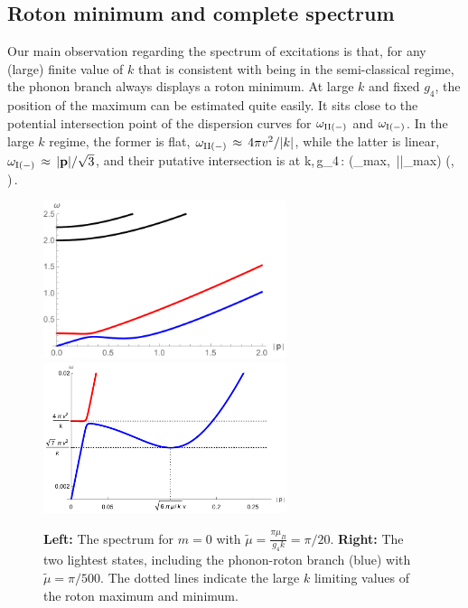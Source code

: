 \subsection{Roton minimum and complete spectrum}
Our main observation regarding the spectrum of excitations is that, for any (large) finite value of $k$ that is consistent with being in the semi-classical regime, the phonon branch always displays a roton minimum. 
At large $k$ and fixed $g_4$, the position of the maximum can be estimated quite easily. It sits close to the potential intersection point of the dispersion curves for $\omega_{\rm II(-)}$ and $\omega_{\rm I (-)}$. In the large $k$ regime, the former is flat, $\omega_{\rm II(-)}\,\approx\, 4\pi v^2/|k|$, while the latter is linear, $\omega_{\rm I(-)} \,\approx\, |{\bf p}|/\sqrt{3}$, and their putative intersection is at 
\be
k,\,g_4\,: \qquad \left(\rm \omega_{\rm max},\, |\p|_{\rm max}\right)\,\approx\,\left(, \, \right)\,.
\ee
\begin{figure}[h]
\begin{center}
\includegraphics[width=2.8in]{Chapter_3_Folder_1806.06976/figures/spectrumk20.pdf}\hspace{0.1in}\includegraphics[width=2.8in]{Chapter_3_Folder_1806.06976/figures/rotonk500.pdf}
\end{center}
    \caption[This figure shows the position and heigh of the roton maximum, in addition to the mass of the lowest state for large values of $k$.]{ \small{{\bf Left:} The spectrum for $m=0$ with $\tilde\mu = \frac{\pi \mu_{B}}{g_4 k} =\pi/20 $. {\bf Right:} The two lightest states, including the phonon-roton branch (blue) with $\tilde\mu=\pi/500$. The dotted lines indicate the large $k$ limiting values of the roton maximum and minimum.
}}
\label{largek}
\end{figure}
